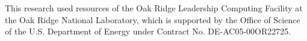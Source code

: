 This research used resources of the Oak Ridge Leadership Computing Facility at the Oak Ridge National Laboratory, 
which is supported by the Office of Science of the U.S. Department of Energy under Contract No. DE-AC05-00OR22725.
